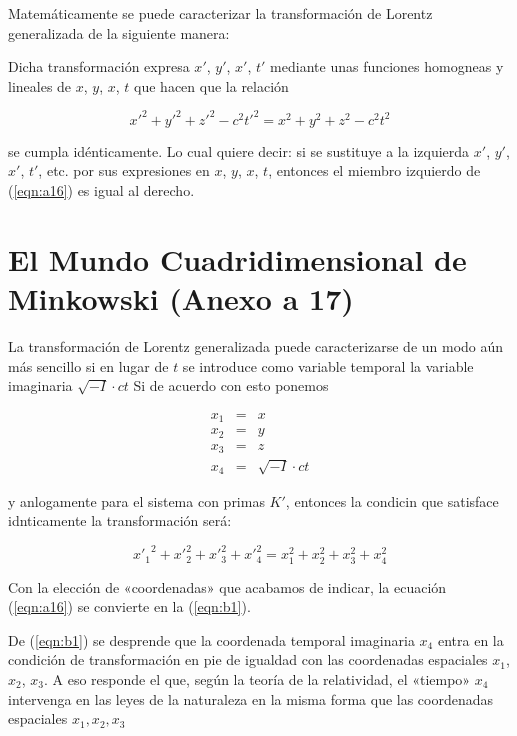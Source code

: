 \documentclass[spanish]{book}
\begin{document}
Matemáticamente se puede caracterizar la transformación de Lorentz generalizada de la
siguiente manera:

Dicha transformación expresa $x'$, $y'$, $x'$, $t'$ mediante unas funciones homogneas y
lineales de $x$, $y$, $x$, $t$ que hacen que la relación

\begin{equation}
x'^{2}+y'^{2}+z'^{2}-c^{2}t'^{2}=x^{2}+y^{2}+z^{2}-c^{2}t^{2}\label{eqn:a16}
\end{equation}

\noindent se cumpla idénticamente. Lo cual quiere decir: si se sustituye a la izquierda $x'$, $y'$, $x'$, $t'$, etc.
por sus expresiones en $x$, $y$, $x$, $t$, entonces el miembro izquierdo de (\ref{eqn:a16}) es igual
al derecho.


\chapter{El Mundo Cuadridimensional de Minkowski (Anexo a 17)}

La transformación de Lorentz generalizada puede caracterizarse de un modo aún más
sencillo si en lugar de $t$ se introduce como variable temporal la variable imaginaria
$\sqrt{-I}\cdot ct$ Si de acuerdo con esto ponemos

\begin{eqnarray*}
x_{1} & = & x\\
x_{2} & = & y\\
x_{3} & = & z\\
x_{4} & = & \sqrt{-I}\cdot ct
\end{eqnarray*}

y anlogamente para el sistema con primas $K'$, entonces la condicin que satisface
idnticamente la transformación será:

\begin{equation}
{x'_{1}}^{2}+{x'}_{2}^{2}+{x'}_{3}^{2}+{x'}_{4}^{2}=x_{1}^{2}+x_{2}^{2}+x_{3}^{2}+x_{4}^{2}\label{eqn:b1}
\end{equation}

\noindent Con la elección de «coordenadas» que acabamos de indicar, la ecuación (\ref{eqn:a16})
se convierte en la (\ref{eqn:b1}).

De (\ref{eqn:b1}) se desprende que la coordenada temporal imaginaria $x_{4}$ entra en la condición
de transformación en pie de igualdad con las coordenadas espaciales $x_{1}$, $x_{2}$, $x_{3}$. A eso
responde el que, según la teoría de la relatividad, el «tiempo» $x_{4}$ intervenga en las
leyes de la naturaleza en la misma forma que las coordenadas espaciales $x_{1},x_{2},x_{3}$
\end{document}
